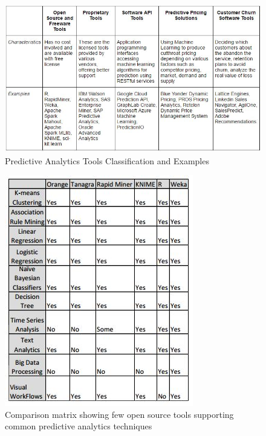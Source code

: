 \documentclass[runningheads]{llncs}
\begin{document}
\begin{figure}[htbp]
	\centering
	
	\vspace{-1.5em}
	\hspace*{-0.45cm}
	
	\includegraphics[scale=0.65]{Figure8.jpg}
	\caption{Predictive Analytics Tools Classification and Examples}
	\label{fig:Figure7}
	
\end{figure}
\begin{figure}[htbp]
	\centering
	
	\vspace{-1.3em}
	\hspace*{-0.45cm}
	
	\includegraphics[scale=0.65]{Figure9.jpg}
	\caption{Comparison matrix showing few open source tools supporting common predictive analytics techniques}
	\label{fig:Figure8}
	
\end{figure} 
\end{document}
